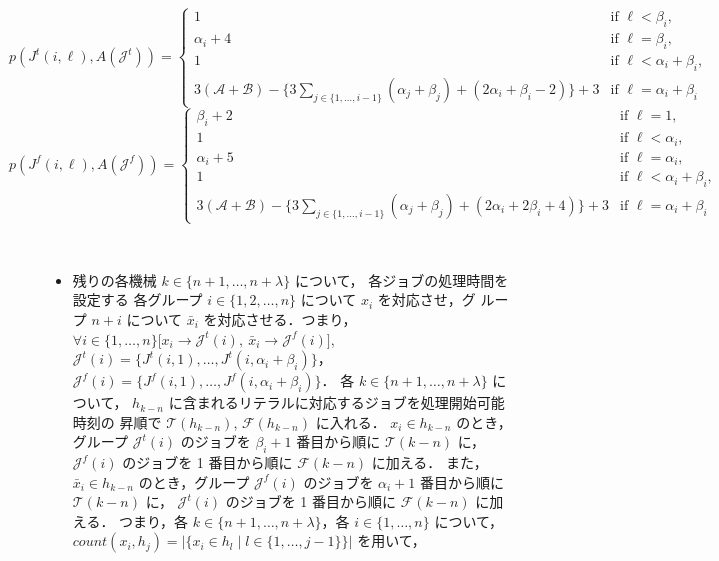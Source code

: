 \documentclass[12pt]{optlab-bachelor}
\begin{document}
{\small
$$p(J^t(i,\ell), A(\mathcal{J}^t)) =
\left\{ \begin{array}{lllll} 1 & \text{if } \ell < \beta_i, \\
\alpha_i + 4 & \text{if } \ell = \beta_i,\\ 1 & \text{if } \ell < \alpha_i + \beta_i, \\
3(\mathcal{A} + \mathcal{B}) - \big\{ 3\displaystyle \sum_{j \in
\{1,\ldots,i - 1\}}(\alpha_j + \beta_j) + (2\alpha_i +
\beta_i - 2)\big \} + 3 & \text{if } \ell = \alpha_i +
\beta_i \end{array} \right.$$
}
{\small
$$p(J^f(i,\ell),A(\mathcal{J}^f)) = \left\{ \begin{array}{lllll}
\beta_i + 2 & \text{if } \ell = 1, \\
1 & \text{if } \ell < \alpha_i, \\ \alpha_i
+ 5 & \text{if } \ell = \alpha_i , \\ 1 & \text{if } \ell < \alpha_i + \beta_i, \\ 3(\mathcal{A} + \mathcal{B}) -
\big\{ 3\displaystyle \sum_{j \in \{1,\ldots,i - 1\}}(\alpha_j + \beta_j)
+ (2\alpha_i + 2\beta_i + 4)\big \} + 3 & \text{if }
\ell = \alpha_i + \beta_i \end{array} \right.$$
}
\begin{description}
  \item[] ~
  \begin{itemize}
    \item 残りの各機械 $k \in \{n + 1, \ldots , n + \lambda\}$ について，
    各ジョブの処理時間を設定する
    各グループ $i \in \{1,2,\ldots,n\}$ について $x_i$ を対応させ，グ
    ループ $n + i$ について $\bar x_i$ を対応させる．つまり，$\forall
    i \in \{1,\ldots,n\}\big[x_i \to \mathcal{J}^t(i),\ \bar x_i \to
    \mathcal{J}^f(i) \big]$,
    $\mathcal{J}^t(i) = \big\{J^t(i,1),\ldots,J^t(i,\alpha_i +
    \beta_i)\big\}$，$\mathcal{J}^f(i) =
    \big\{J^f(i,1),\ldots,J^f(i,\alpha_i + \beta_i)\big\}$．
    各 $k \in \{n + 1, \ldots , n + \lambda\}$ について，
    $h_{k - n}$ に含まれるリテラルに対応するジョブを処理開始可能時刻の
    昇順で $\mathcal{T}(h_{k - n})$, $\mathcal{F}(h_{k - n})$ に入れる．
    $x_i \in h_{k - n}$ のとき，グループ $\mathcal{J}^t(i)$ のジョブを
    $\beta_i + 1$ 番目から順に $\mathcal{T}(k - n)$ に，
    $\mathcal{J}^f(i)$ のジョブを 1 番目から順に $\mathcal{F}(k - n)$ に加える．
    また，$\bar x_i \in h_{k - n}$ のとき，グループ $\mathcal{J}^f(i)$
    のジョブを $\alpha_i + 1$ 番目から順に $\mathcal{T}(k - n)$ に，
    $\mathcal{J}^t(i)$ のジョブを 1 番目から順に $\mathcal{F}(k - n)$ に加える．
    つまり，各 $k \in \{n + 1, \ldots,n + \lambda\}$，各 $i \in \{1,\ldots,n\}$
    について，$count(x_i,h_j) = \big|\big\{x_i \in h_l \mid l \in \{1,\ldots,j -
    1\}\big\}\big|$ を用いて，
  \end{itemize}
\end{description}
\end{document}
